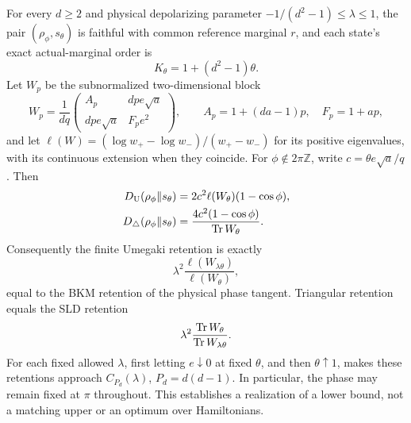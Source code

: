 \begin{theorem}\label{thm:phase}
For every $d\ge2$ and physical depolarizing parameter $-1/(d^2-1)\le\lambda\le1$, the pair $(\rho_\phi,s_\theta)$ is faithful with common reference marginal $r$, and each state's exact actual-marginal order is
\[
 K_\theta=1+(d^2-1)\theta.
\]
Let $W_p$ be the subnormalized two-dimensional block
\[
 W_p=\frac1{dq}\begin{pmatrix}
 A_p&dp e\sqrt a\\dp e\sqrt a&F_pe^2
 \end{pmatrix},\qquad A_p=1+(da-1)p,\quad F_p=1+ap,
\]
and let $\ell(W)=(\log w_+-\log w_-)/(w_+-w_-)$ for its positive eigenvalues, with its continuous extension when they coincide. For $\phi\notin2\pi\mathbb Z$, write $c=\theta e\sqrt a/q$. Then
\begin{align}
 D_{\mathrm U}(\rho_\phi\Vert s_\theta)
   &=2c^2\ell(W_\theta)(1-\cos\phi),\label{eq:phase-entropy}\\
 D_{\triangle}(\rho_\phi\Vert s_\theta)
   &=\frac{4c^2(1-\cos\phi)}{\operatorname{Tr} W_\theta}.\label{eq:phase-triangle}
\end{align}
Consequently the finite Umegaki retention is exactly
\[
 \lambda^2\frac{\ell(W_{\lambda\theta})}{\ell(W_\theta)},
\]
equal to the BKM retention of the physical phase tangent. Triangular retention equals the SLD retention
\[
 \lambda^2\frac{\operatorname{Tr} W_\theta}{\operatorname{Tr} W_{\lambda\theta}}.
\]
For each fixed allowed $\lambda$, first letting $e\downarrow0$ at fixed $\theta$, and then $\theta\uparrow1$, makes these retentions approach $C_{P_d}(\lambda)$, $P_d=d(d-1)$. In particular, the phase may remain fixed at $\pi$ throughout. This establishes a realization of a lower bound, not a matching upper or an optimum over Hamiltonians.
\end{theorem}
